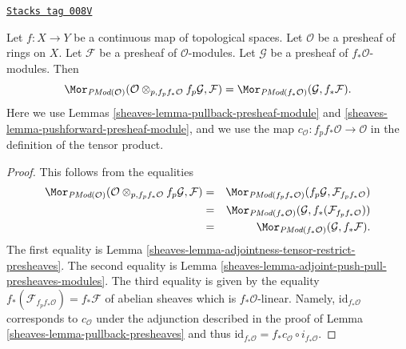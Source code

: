 \begin{lemma}
\label{sheaves-lemma-adjoint-pull-push-presheaves-modules}
\href{https://stacks.math.columbia.edu/tag/008V}{\texttt{Stacks tag 008V}}

Let $f : X \to Y$ be a continuous map of topological spaces.
Let $\mathcal{O}$ be a presheaf of rings on $X$.
Let $\mathcal{F}$ be a presheaf of $\mathcal{O}$-modules.
Let $\mathcal{G}$ be a presheaf of $f_*\mathcal{O}$-modules.
Then
$$
\Mor_{\textit{PMod}(\mathcal{O})}(
\mathcal{O} \otimes_{p, f_pf_*\mathcal{O}} f_p\mathcal{G}, \mathcal{F})
=
\Mor_{\textit{PMod}(f_*\mathcal{O})}(\mathcal{G}, f_*\mathcal{F}).
$$
Here we use
Lemmas \ref{sheaves-lemma-pullback-presheaf-module}
and \ref{sheaves-lemma-pushforward-presheaf-module}, and we use
the map $c_\mathcal{O} : f_pf_*\mathcal{O} \to \mathcal{O}$
in the definition of the tensor product.
\end{lemma}

\begin{proof}

This follows from the equalities
\begin{eqnarray*}
\Mor_{\textit{PMod}(\mathcal{O})}(
\mathcal{O} \otimes_{p, f_pf_*\mathcal{O}} f_p\mathcal{G}, \mathcal{F})
& = &
\Mor_{\textit{PMod}(f_pf_*\mathcal{O})}(
f_p\mathcal{G}, \mathcal{F}_{f_pf_*\mathcal{O}}) \\
& = &
\Mor_{\textit{PMod}(f_*\mathcal{O})}(\mathcal{G},
f_*(\mathcal{F}_{f_pf_*\mathcal{O}})) \\
& = &
\Mor_{\textit{PMod}(f_*\mathcal{O})}(\mathcal{G}, f_*\mathcal{F}).
\end{eqnarray*}
The first equality is
Lemma \ref{sheaves-lemma-adjointness-tensor-restrict-presheaves}.
The second equality is
Lemma \ref{sheaves-lemma-adjoint-push-pull-presheaves-modules}.
The third equality is given by the equality
$f_*(\mathcal{F}_{f_pf_*\mathcal{O}}) = f_*\mathcal{F}$
of abelian sheaves which is $f_*\mathcal{O}$-linear. Namely,
$\text{id}_{f_*\mathcal{O}}$ corresponds to $c_\mathcal{O}$
under the adjunction described in the proof of
Lemma \ref{sheaves-lemma-pullback-presheaves}
and thus
$\text{id}_{f_*\mathcal{O}} = f_*c_\mathcal{O} \circ i_{f_*\mathcal{O}}$.
\end{proof}

